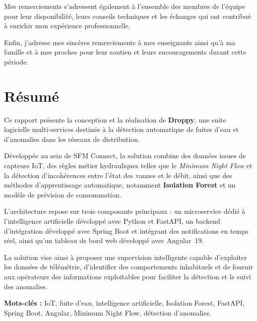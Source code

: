 \documentclass[12pt,a4paper,twoside]{report}
\begin{document}
Mes remerciements s'adressent également à l'ensemble des membres de
l'équipe pour leur disponibilité, leurs conseils techniques et les
échanges qui ont contribué à enrichir mon expérience professionnelle.

Enfin, j'adresse mes sincères remerciements à mes enseignants ainsi
qu'à ma famille et à mes proches pour leur soutien et leurs
encouragements durant cette période.


\chapter*{Résumé}


Ce rapport présente la conception et la réalisation de
\textbf{Droppy}, une suite logicielle multi-services destinée à la
détection automatique de fuites d'eau et d'anomalies dans les réseaux
de distribution.

Développée au sein de SFM Connect, la solution combine des données
issues de capteurs IoT, des règles métier hydrauliques telles que le
\textit{Minimum Night Flow} et la détection d'incohérences entre
l'état des vannes et le débit, ainsi que des méthodes d'apprentissage
automatique, notamment \textbf{Isolation Forest} et un modèle de
prévision de consommation.

L'architecture repose sur trois composants principaux : un
microservice dédié à l'intelligence artificielle développé avec
Python et FastAPI, un backend d'intégration développé avec Spring Boot
et intégrant des notifications en temps réel, ainsi qu'un tableau de
bord web développé avec Angular~19.

La solution vise ainsi à proposer une supervision intelligente capable
d'exploiter les données de télémétrie, d'identifier des comportements
inhabituels et de fournir aux opérateurs des informations exploitables
pour faciliter la détection et le suivi des anomalies.

\textbf{\textcolor{DroppyBlue}{Mots-clés :}}
IoT, fuite d'eau, intelligence artificielle, Isolation Forest,
FastAPI, Spring Boot, Angular, Minimum Night Flow, détection
d'anomalies.

\end{document}
